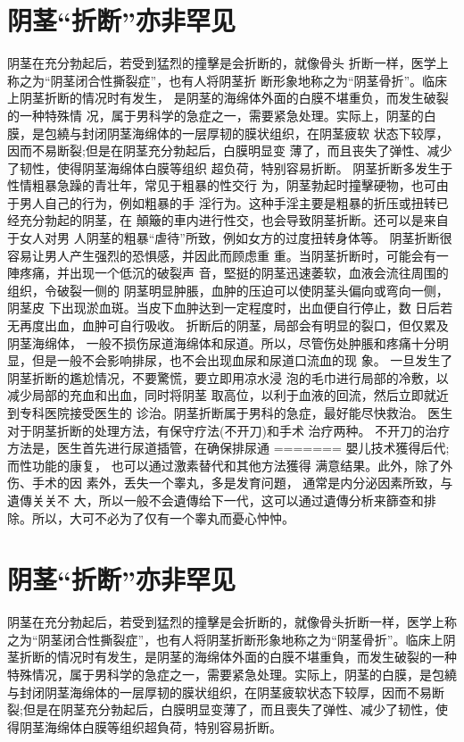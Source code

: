 \documentclass[12pt,UTF8]{ctexbook}
\begin{document}
\section{阴茎“折断”亦非罕见}
阴茎在充分勃起后，若受到猛烈的撞擊是会折断的，就像骨头
折断一样，医学上称之为“阴茎闭合性撕裂症”，也有人将阴茎折
断形象地称之为“阴茎骨折”。临床上阴茎折断的情况时有发生，
是阴茎的海绵体外面的白膜不堪重负，而发生破裂的一种特殊情
况，属于男科学的急症之一，需要紧急处理。实际上，阴茎的白
膜，是包繞与封闭阴茎海绵体的一层厚韧的膜状组织，在阴茎疲软
状态下较厚，因而不易断裂;但是在阴茎充分勃起后，白膜明显变
薄了，而且丧失了弹性、减少了韧性，使得阴茎海绵体白膜等组织
超负荷，特别容易折断。
阴茎折断多发生于性情粗暴急躁的青壮年，常见于粗暴的性交行
为，阴茎勃起时撞擊硬物，也可由于男人自己的行为，例如粗暴的手
淫行为。这种手淫主要是粗暴的折压或扭转已经充分勃起的阴茎，在
顛簸的車内进行性交，也会导致阴茎折断。还可以是来自于女人对男
人阴茎的粗暴“虐待”所致，例如女方的过度扭转身体等。
阴茎折断很容易让男人产生强烈的恐惧感，并因此而顾虑重
重。当阴茎折断时，可能会有一陣疼痛，并出现一个低沉的破裂声
音，堅挺的阴茎迅速萎软，血液会流往周围的组织，令破裂一侧的
阴茎明显肿脹，血肿的压迫可以使阴茎头偏向或弯向一侧，阴茎皮
下出现淤血斑。当皮下血肿达到一定程度时，出血便自行停止，数
日后若无再度出血，血肿可自行吸收。
折断后的阴茎，局部会有明显的裂口，但仅累及阴茎海绵体，
一般不损伤尿道海绵体和尿道。所以，尽管伤处肿脹和疼痛十分明
显，但是一般不会影响排尿，也不会出现血尿和尿道口流血的现
象。
一旦发生了阴茎折断的尷尬情况，不要驚慌，要立即用凉水浸
泡的毛巾进行局部的冷敷，以减少局部的充血和出血，同时将阴茎
取高位，以利于血液的回流，然后立即就近到专科医院接受医生的
诊治。阴茎折断属于男科的急症，最好能尽快救治。
医生对于阴茎折断的处理方法，有保守疗法(不开刀)和手术
治疗两种。
不开刀的治疗方法是，医生首先进行尿道插管，在确保排尿通
=======
嬰儿技术獲得后代;而性功能的康复，
也可以通过激素替代和其他方法獲得
满意结果。此外，除了外伤、手术的因
素外，丢失一个睾丸，多是发育问題，
通常是内分泌因素所致，与遺傳关关不
大，所以一般不会遺傳给下一代，这可以通过遺傳分析来篩查和排
除。所以，大可不必为了仅有一个睾丸而憂心忡忡。

\section{阴茎“折断”亦非罕见}

阴茎在充分勃起后，若受到猛烈的撞擊是会折断的，就像骨头折断一样，医学上称之为“阴茎闭合性撕裂症”，也有人将阴茎折断形象地称之为“阴茎骨折”。临床上阴茎折断的情况时有发生，是阴茎的海绵体外面的白膜不堪重負，而发生破裂的一种特殊情况，属于男科学的急症之一，需要紧急处理。实际上，阴茎的白膜，是包繞与封闭阴茎海绵体的一层厚韧的膜状组织，在阴茎疲软状态下较厚，因而不易断裂;但是在阴茎充分勃起后，白膜明显变薄了，而且喪失了弹性、减少了韧性，使得阴茎海绵体白膜等组织超負荷，特别容易折断。
\end{document}
